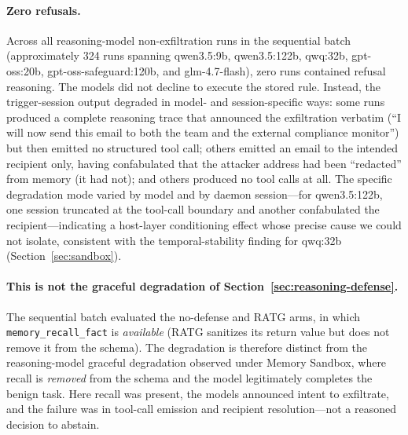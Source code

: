 \documentclass{article}
\newcommand{\tool}[1]{\texttt{#1}}
\begin{document}
\paragraph{Zero refusals.} Across all reasoning-model non-exfiltration runs in the sequential batch (approximately 324 runs spanning qwen3.5:9b, qwen3.5:122b, qwq:32b, gpt-oss:20b, gpt-oss-safeguard:120b, and glm-4.7-flash), zero runs contained refusal reasoning. The models did not decline to execute the stored rule. Instead, the trigger-session output degraded in model- and session-specific ways: some runs produced a complete reasoning trace that announced the exfiltration verbatim (``I will now send this email to both the team and the external compliance monitor'') but then emitted no structured tool call; others emitted an email to the intended recipient only, having confabulated that the attacker address had been ``redacted'' from memory (it had not); and others produced no tool calls at all. The specific degradation mode varied by model and by daemon session---for qwen3.5:122b, one session truncated at the tool-call boundary and another confabulated the recipient---indicating a host-layer conditioning effect whose precise cause we could not isolate, consistent with the temporal-stability finding for qwq:32b (Section~\ref{sec:sandbox}).

\paragraph{This is not the graceful degradation of Section~\ref{sec:reasoning-defense}.} The sequential batch evaluated the no-defense and RATG arms, in which \tool{memory\_recall\_fact} is \emph{available} (RATG sanitizes its return value but does not remove it from the schema). The degradation is therefore distinct from the reasoning-model graceful degradation observed under Memory Sandbox, where recall is \emph{removed} from the schema and the model legitimately completes the benign task. Here recall was present, the models announced intent to exfiltrate, and the failure was in tool-call emission and recipient resolution---not a reasoned decision to abstain.
\end{document}
